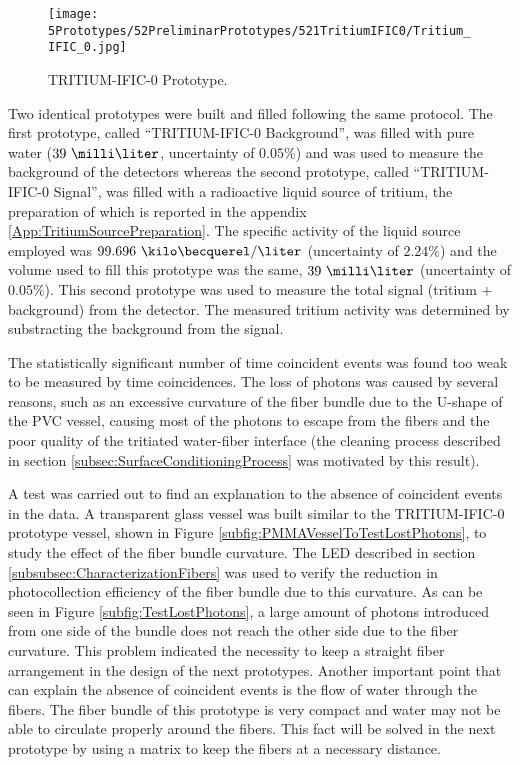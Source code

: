 \begin{figure}[h]
\centering
\texttt{[image: 5Prototypes/52PreliminarPrototypes/521TritiumIFIC0/Tritium\_IFIC\_0.jpg]}
\caption{TRITIUM-IFIC-0 Prototype.\label{fig:TritiumIFIC0}}
\end{figure}

Two identical prototypes were built and filled following the same protocol. The first prototype, called ``TRITIUM-IFIC-0 Background'', was filled with pure water ($39~\milli\liter$, uncertainty of $0.05\%$) and was used to measure the background of the detectors whereas the second prototype, called ``TRITIUM-IFIC-0 Signal'', was filled with a radioactive liquid source of tritium, the preparation of which is reported in the appendix \ref{App:TritiumSourcePreparation}. The specific activity of the liquid source employed was $99.696~\kilo\becquerel/\liter$ (uncertainty of $2.24\%$) and the volume used to fill this prototype was the same, $39~\milli\liter$ (uncertainty of $0.05\%$). This second prototype was used to measure the total signal (tritium + background) from the detector. The measured tritium activity was determined by substracting the background from the signal. 

The statistically significant number of time coincident events was found too weak to be measured by time coincidences. The loss of photons was caused by several reasons, such as an excessive curvature of the fiber bundle due to the U-shape of the PVC vessel, causing most of the photons to escape from the fibers and the poor quality of the tritiated water-fiber interface (the cleaning process described in section \ref{subsec:SurfaceConditioningProcess} was motivated by this result). 

A test was carried out to find an explanation to the absence of coincident events in the data. A transparent glass vessel was built similar to the TRITIUM-IFIC-0 prototype vessel, shown in Figure \ref{subfig:PMMAVesselToTestLostPhotons}, to study the effect of the fiber bundle curvature. The LED described in section \ref{subsubsec:CharacterizationFibers} was used to verify the reduction in photocollection efficiency of the fiber bundle due to this curvature. As can be seen in Figure \ref{subfig:TestLostPhotons}, a large amount of photons introduced from one side of the bundle does not reach the other side due to the fiber curvature. This problem indicated the necessity to keep a straight fiber arrangement in the design of the next prototypes. Another important point that can explain the absence of coincident events is the flow of water through the fibers. The fiber bundle of this prototype is very compact and water may not be able to circulate properly around the fibers. This fact will be solved in the next prototype by using a matrix to keep the fibers at a necessary distance.

